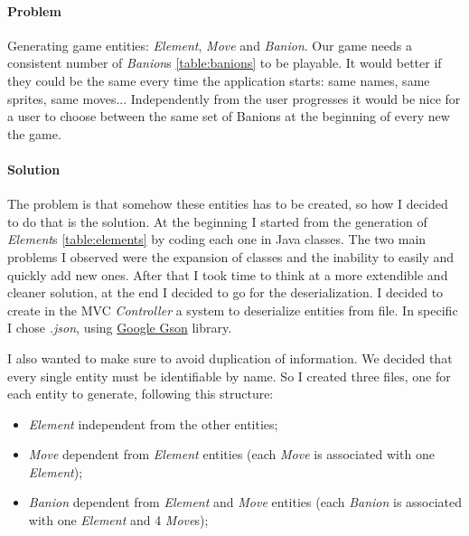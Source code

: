 \documentclass[12pt, a4paper]{report}
\theoremstyle{definition}
\begin{document}
            \paragraph{Problem}
            
            Generating game entities: \emph{Element}, \emph{Move} and \emph{Banion}. Our game needs a consistent number of \emph{Banion}s \ref{table:banions} to be playable.
            It would better if they could be the same every time the application starts: same names, same sprites, same moves...
            Independently from the user progresses it would be nice for a user to choose between the same set of Banions at the beginning of every new the game.

            \paragraph{Solution}

            The problem is that somehow these entities has to be created, so how I decided to do that is the solution.
            At the beginning I started from the generation of \emph{Element}s \ref{table:elements} by coding each one in Java classes.
            The two main problems I observed were the expansion of classes and the inability to easily and quickly add new ones.
            After that I took time to think at a more extendible and cleaner solution, at the end I decided to go for the deserialization.
            I decided to create in the MVC \emph{Controller} a system to deserialize entities from file.
            In specific I chose \textit{.json}, using \href{https://github.com/google/gson}{Google Gson} library.
            
            I also wanted to make sure to avoid duplication of information.
            We decided that every single entity must be identifiable by name.
            So I created three files, one for each entity to generate, following this structure:
            \begin{itemize}
                \item \emph{Element} \textrightarrow independent from the other entities;
                \item \emph{Move} \textrightarrow dependent from \emph{Element} entities (each \emph{Move} is associated with one \emph{Element});
                \item \emph{Banion} \textrightarrow dependent from \emph{Element} and \emph{Move} entities (each \emph{Banion} is associated with one \emph{Element} and 4 \emph{Move}s);
            \end{itemize}
\end{document}
